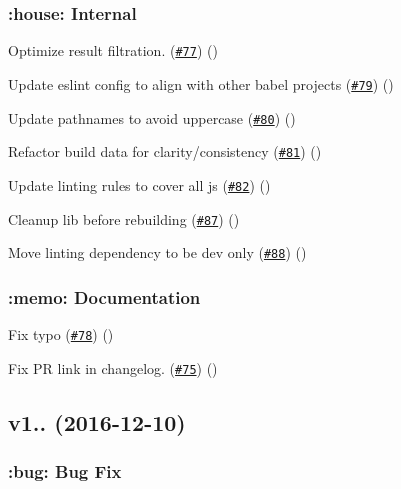 \subsubsection*{\+:house\+: Internal}


\begin{DoxyItemize}
\item Optimize result filtration. (\href{https://github.com/babel/babel-preset-env/pull/77}{\tt \#77}) ()
\item Update eslint config to align with other babel projects (\href{https://github.com/babel/babel-preset-env/pull/79}{\tt \#79}) ()
\item Update pathnames to avoid uppercase (\href{https://github.com/babel/babel-preset-env/pull/80}{\tt \#80}) ()
\item Refactor build data for clarity/consistency (\href{https://github.com/babel/babel-preset-env/pull/81}{\tt \#81}) ()
\item Update linting rules to cover all js (\href{https://github.com/babel/babel-preset-env/pull/82}{\tt \#82}) ()
\item Cleanup lib before rebuilding (\href{https://github.com/babel/babel-preset-env/pull/87}{\tt \#87}) ()
\item Move linting dependency to be dev only (\href{https://github.com/babel/babel-preset-env/pull/88}{\tt \#88}) ()
\end{DoxyItemize}

\subsubsection*{\+:memo\+: Documentation}


\begin{DoxyItemize}
\item Fix typo (\href{https://github.com/babel/babel-preset-env/pull/78}{\tt \#78}) ()
\item Fix PR link in changelog. (\href{https://github.com/babel/babel-preset-env/pull/75}{\tt \#75}) ()
\end{DoxyItemize}

\subsection*{v1.. (2016-\/12-\/10)}

\subsubsection*{\+:bug\+: Bug Fix}


